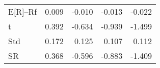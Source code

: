 \begin{tabular}{lrrrr}
\toprule
\midrule
E[R]--Rf & 0.009 & -0.010 & -0.013 & -0.022 \\
t & 0.392 & -0.634 & -0.939 & -1.499 \\
Std & 0.172 & 0.125 & 0.107 & 0.112 \\
SR & 0.368 & -0.596 & -0.883 & -1.409 \\
\bottomrule
\end{tabular}
